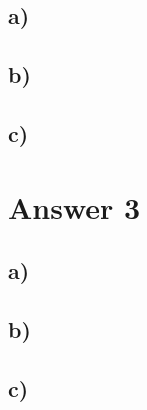 \documentclass[12pt]{article}
\begin{document}
\subsection*{a)} 

\subsection*{b)} 

\subsection*{c)} 


\section*{Answer 3}
\subsection*{a)} 
\subsection*{b)} 
\subsection*{c)} 
\end{document}
